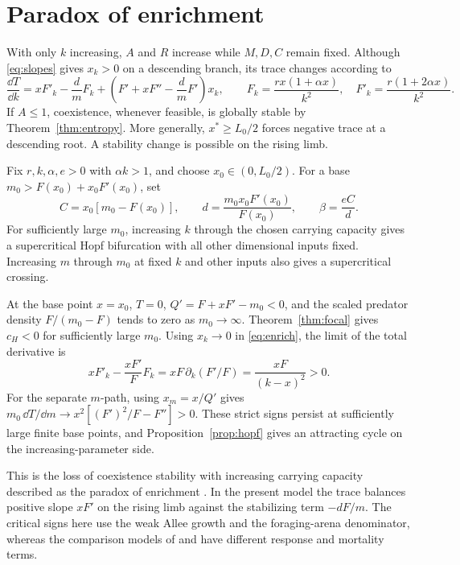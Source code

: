 \section{Paradox of enrichment}\label{sec:enrich}
With only \(k\) increasing, \(A\) and \(R\) increase while \(M,D,C\) remain fixed. Although \eqref{eq:slopes} gives \(x_k>0\) on a descending branch, its trace changes according to
\begin{equation}\label{eq:enrich}
 \frac{\dd T}{\dd k}=xF'_k-\frac d m F_k+\left(F'+xF''-\frac d m F'\right)x_k,\qquad
 F_k=\frac{rx(1+\alpha x)}{k^2},\quad F'_k=\frac{r(1+2\alpha x)}{k^2}.
\end{equation}
If \(A\le1\), coexistence, whenever feasible, is globally stable by Theorem~\ref{thm:entropy}. More generally, \(x^*\ge L_0/2\) forces negative trace at a descending root. A stability change is possible on the rising limb.

\begin{theorem}\label{thm:enrich}
Fix \(r,k,\alpha,e>0\) with \(\alpha k>1\), and choose \(x_0\in(0,L_0/2)\). For a base \(m_0>F(x_0)+x_0F'(x_0)\), set
\begin{equation}\label{eq:enrichfamily}
 C=x_0[m_0-F(x_0)],\qquad d=\frac{m_0x_0F'(x_0)}{F(x_0)},\qquad
 \beta=\frac{eC}{d}.
\end{equation}
For sufficiently large \(m_0\), increasing \(k\) through the chosen carrying capacity gives a supercritical Hopf bifurcation with all other dimensional inputs fixed. Increasing \(m\) through \(m_0\) at fixed \(k\) and other inputs also gives a supercritical crossing.
\end{theorem}
At the base point \(x=x_0\), \(T=0\), \(Q'=F+xF'-m_0<0\), and the scaled predator density \(F/(m_0-F)\) tends to zero as \(m_0\to\infty\). Theorem~\ref{thm:focal} gives \(c_H<0\) for sufficiently large \(m_0\). Using \(x_k\to0\) in \eqref{eq:enrich}, the limit of the total derivative is
\begin{equation}\label{eq:enrichlimit}
 xF'_k-\frac{xF'}F F_k=xF\,\partial_k(F'/F)=\frac{xF}{(k-x)^2}>0 .
\end{equation}
For the separate \(m\)-path, using \(x_m=x/Q'\) gives
\(m_0\,\dd T/\dd m\to x^2[(F')^2/F-F'']>0\). These strict signs persist at sufficiently large finite base points, and Proposition~\ref{prop:hopf} gives an attracting cycle on the increasing-parameter side.

This is the loss of coexistence stability with increasing carrying capacity described as the paradox of enrichment \citep{rosenzweig71}. In the present model the trace balances positive slope \(xF'\) on the rising limb against the stabilizing term \(-dF/m\). The critical signs here use the weak Allee growth and the foraging-arena denominator, whereas the comparison models of \citet{haque09} and \citet{haque11} have different response and mortality terms.


